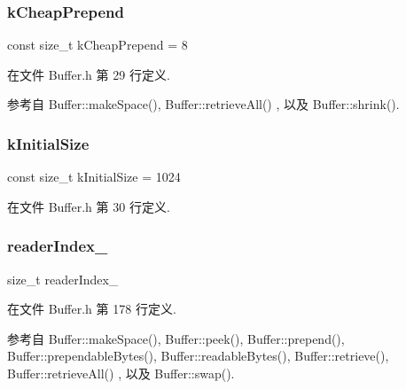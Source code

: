 \subsubsection{\texorpdfstring{k\+Cheap\+Prepend}{kCheapPrepend}}
{\footnotesize\ttfamily const size\+\_\+t k\+Cheap\+Prepend = 8\hspace{0.3cm}{\ttfamily [static]}}



在文件 Buffer.\+h 第 29 行定义.



参考自 Buffer\+::make\+Space(), Buffer\+::retrieve\+All() , 以及 Buffer\+::shrink().

\mbox{\label{classmuduo_1_1Buffer_a50181a12c6e534352c6c3cf9e0d8b331}} 
\subsubsection{\texorpdfstring{k\+Initial\+Size}{kInitialSize}}
{\footnotesize\ttfamily const size\+\_\+t k\+Initial\+Size = 1024\hspace{0.3cm}{\ttfamily [static]}}



在文件 Buffer.\+h 第 30 行定义.

\mbox{\label{classmuduo_1_1Buffer_a8af076cf34524e62b7392ca568468a7d}} 
\subsubsection{\texorpdfstring{reader\+Index\+\_\+}{readerIndex\_}}
{\footnotesize\ttfamily size\+\_\+t reader\+Index\+\_\+\hspace{0.3cm}{\ttfamily [private]}}



在文件 Buffer.\+h 第 178 行定义.



参考自 Buffer\+::make\+Space(), Buffer\+::peek(), Buffer\+::prepend(), Buffer\+::prependable\+Bytes(), Buffer\+::readable\+Bytes(), Buffer\+::retrieve(), Buffer\+::retrieve\+All() , 以及 Buffer\+::swap().

